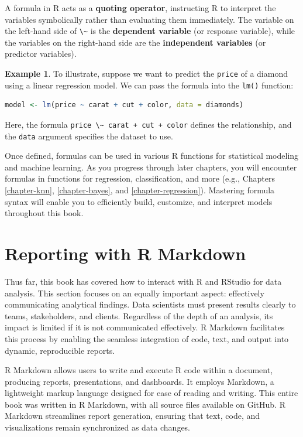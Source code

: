 \documentclass[
]{book}
\newcommand{\passthrough}[1]{#1}
\theoremstyle{definition}
\theoremstyle{definition}
\newtheorem{example}{Example}[chapter]
\theoremstyle{definition}
\theoremstyle{definition}
\theoremstyle{remark}
\begin{document}
A formula in R acts as a \textbf{quoting operator}, instructing R to interpret the variables symbolically rather than evaluating them immediately. The variable on the left-hand side of \passthrough{\lstinline!\~!} is the \textbf{dependent variable} (or response variable), while the variables on the right-hand side are the \textbf{independent variables} (or predictor variables).

\begin{example}
\protect\hypertarget{exm:ex-formula}{}\label{exm:ex-formula}To illustrate, suppose we want to predict the \passthrough{\lstinline!price!} of a diamond using a linear regression model. We can pass the formula into the \passthrough{\lstinline!lm()!} function:

\begin{lstlisting}[language=R]
model <- lm(price ~ carat + cut + color, data = diamonds)
\end{lstlisting}

Here, the formula \passthrough{\lstinline!price \~ carat + cut + color!} defines the relationship, and the \passthrough{\lstinline!data!} argument specifies the dataset to use.
\end{example}

Once defined, formulas can be used in various R functions for statistical modeling and machine learning. As you progress through later chapters, you will encounter formulas in functions for regression, classification, and more (e.g., Chapters \ref{chapter-knn}, \ref{chapter-bayes}, and \ref{chapter-regression}). Mastering formula syntax will enable you to efficiently build, customize, and interpret models throughout this book.

\section{Reporting with R Markdown}\label{reporting-with-r-markdown}

Thus far, this book has covered how to interact with R and RStudio for data analysis. This section focuses on an equally important aspect: effectively communicating analytical findings. Data scientists must present results clearly to teams, stakeholders, and clients. Regardless of the depth of an analysis, its impact is limited if it is not communicated effectively. R Markdown facilitates this process by enabling the seamless integration of code, text, and output into dynamic, reproducible reports.

R Markdown allows users to write and execute R code within a document, producing reports, presentations, and dashboards. It employs Markdown, a lightweight markup language designed for ease of reading and writing. This entire book was written in R Markdown, with all source files available on GitHub. R Markdown streamlines report generation, ensuring that text, code, and visualizations remain synchronized as data changes.
\end{document}
